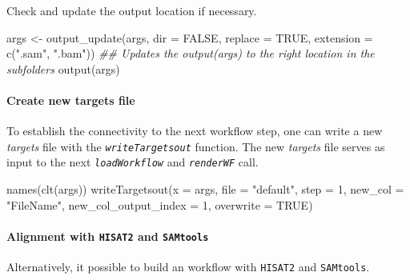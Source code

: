 \documentclass[14pt,]{article}
\newcommand{\hlnum}[1]{\textcolor[rgb]{0.816,0.125,0.439}{#1}}%
\newcommand{\hlstr}[1]{\textcolor[rgb]{0.251,0.627,0.251}{#1}}%
\newcommand{\hlcom}[1]{\textcolor[rgb]{0.502,0.502,0.502}{\textit{#1}}}%
\newcommand{\hlstd}[1]{\textcolor[rgb]{0.251,0.251,0.251}{#1}}%
\newcommand{\hlkwc}[1]{\textcolor[rgb]{0.251,0.251,0.251}{#1}}%
\newcommand{\hlkwd}[1]{\textcolor[rgb]{0.878,0.439,0.125}{#1}}%
\newenvironment{Shaded}{\begin{myshaded}}{\end{myshaded}}
\newcommand{\KeywordTok}[1]{\hlkwd{#1}}
\newcommand{\DataTypeTok}[1]{\hlkwc{#1}}
\newcommand{\DecValTok}[1]{\hlnum{#1}}
\newcommand{\StringTok}[1]{\hlstr{#1}}
\newcommand{\CommentTok}[1]{\hlcom{#1}}
\newcommand{\OtherTok}[1]{{#1}}
\newcommand{\NormalTok}[1]{\hlstd{#1}}
\begin{document}
Check and update the output location if necessary.

\begin{Shaded}
\begin{Highlighting}[]
\NormalTok{args <-}\StringTok{ }\KeywordTok{output_update}\NormalTok{(args, }\DataTypeTok{dir =} \OtherTok{FALSE}\NormalTok{, }\DataTypeTok{replace =} \OtherTok{TRUE}\NormalTok{, }\DataTypeTok{extension =} \KeywordTok{c}\NormalTok{(}\StringTok{".sam"}\NormalTok{, }\StringTok{".bam"}\NormalTok{))  }\CommentTok{## Updates the output(args) to the right location in the subfolders}
\KeywordTok{output}\NormalTok{(args)}
\end{Highlighting}
\end{Shaded}

\hypertarget{create-new-targets-file}{%
\paragraph{Create new targets file}\label{create-new-targets-file}}

To establish the connectivity to the next workflow step, one can write a new
\emph{targets} file with the \emph{\texttt{writeTargetsout}} function. The new \emph{targets} file
serves as input to the next \emph{\texttt{loadWorkflow}} and \emph{\texttt{renderWF}} call.

\begin{Shaded}
\begin{Highlighting}[]
\KeywordTok{names}\NormalTok{(}\KeywordTok{clt}\NormalTok{(args))}
\KeywordTok{writeTargetsout}\NormalTok{(}\DataTypeTok{x =}\NormalTok{ args, }\DataTypeTok{file =} \StringTok{"default"}\NormalTok{, }\DataTypeTok{step =} \DecValTok{1}\NormalTok{, }\DataTypeTok{new_col =} \StringTok{"FileName"}\NormalTok{, }\DataTypeTok{new_col_output_index =} \DecValTok{1}\NormalTok{, }
    \DataTypeTok{overwrite =} \OtherTok{TRUE}\NormalTok{)}
\end{Highlighting}
\end{Shaded}

\hypertarget{alignment-with-hisat2-and-samtools}{%
\paragraph{\texorpdfstring{Alignment with \texttt{HISAT2} and \texttt{SAMtools}}{Alignment with HISAT2 and SAMtools}}\label{alignment-with-hisat2-and-samtools}}

Alternatively, it possible to build an workflow with \texttt{HISAT2} and \texttt{SAMtools}.
\end{document}
